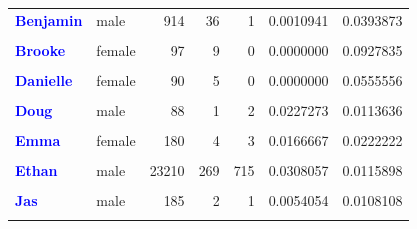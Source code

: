 \documentclass[
  man]{apa6}
\begin{document}
\begin{table}[!h]
\begin{tabular}[t]{>{}llrrrrr}
\textcolor{blue}{\textbf{Benjamin}} & male & 914 & 36 & 1 & 0.0010941 & 0.0393873\\
\textcolor{blue}{\textbf{\cellcolor{gray!10}{Brian}}} & \cellcolor{gray!10}{male} & \cellcolor{gray!10}{89} & \cellcolor{gray!10}{1} & \cellcolor{gray!10}{0} & \cellcolor{gray!10}{0.0000000} & \cellcolor{gray!10}{0.0112360}\\
\textcolor{blue}{\textbf{Brooke}} & female & 97 & 9 & 0 & 0.0000000 & 0.0927835\\
\addlinespace
\textcolor{blue}{\textbf{\cellcolor{gray!10}{Carol}}} & \cellcolor{gray!10}{female} & \cellcolor{gray!10}{83} & \cellcolor{gray!10}{12} & \cellcolor{gray!10}{0} & \cellcolor{gray!10}{0.0000000} & \cellcolor{gray!10}{0.1445783}\\
\textcolor{blue}{\textbf{Danielle}} & female & 90 & 5 & 0 & 0.0000000 & 0.0555556\\
\textcolor{blue}{\textbf{\cellcolor{gray!10}{David}}} & \cellcolor{gray!10}{male} & \cellcolor{gray!10}{688} & \cellcolor{gray!10}{75} & \cellcolor{gray!10}{24} & \cellcolor{gray!10}{0.0348837} & \cellcolor{gray!10}{0.1090116}\\
\textcolor{blue}{\textbf{Doug}} & male & 88 & 1 & 2 & 0.0227273 & 0.0113636\\
\textcolor{blue}{\textbf{\cellcolor{gray!10}{Emily}}} & \cellcolor{gray!10}{female} & \cellcolor{gray!10}{142} & \cellcolor{gray!10}{2} & \cellcolor{gray!10}{0} & \cellcolor{gray!10}{0.0000000} & \cellcolor{gray!10}{0.0140845}\\
\addlinespace
\textcolor{blue}{\textbf{Emma}} & female & 180 & 4 & 3 & 0.0166667 & 0.0222222\\
\textcolor{blue}{\textbf{\cellcolor{gray!10}{Erica}}} & \cellcolor{gray!10}{female} & \cellcolor{gray!10}{123} & \cellcolor{gray!10}{3} & \cellcolor{gray!10}{0} & \cellcolor{gray!10}{0.0000000} & \cellcolor{gray!10}{0.0243902}\\
\textcolor{blue}{\textbf{Ethan}} & male & 23210 & 269 & 715 & 0.0308057 & 0.0115898\\
\textcolor{blue}{\textbf{\cellcolor{gray!10}{Jarret}}} & \cellcolor{gray!10}{male} & \cellcolor{gray!10}{99} & \cellcolor{gray!10}{0} & \cellcolor{gray!10}{1} & \cellcolor{gray!10}{0.0101010} & \cellcolor{gray!10}{0.0000000}\\
\textcolor{blue}{\textbf{Jas}} & male & 185 & 2 & 1 & 0.0054054 & 0.0108108\\
\addlinespace
\textcolor{blue}{\textbf{\cellcolor{gray!10}{Jase}}} & \cellcolor{gray!10}{male} & \cellcolor{gray!10}{1777} & \cellcolor{gray!10}{88} & \cellcolor{gray!10}{71} & \cellcolor{gray!10}{0.0399550} & \cellcolor{gray!10}{0.0495217}\\

\end{tabular}
\end{table}
\end{document}
